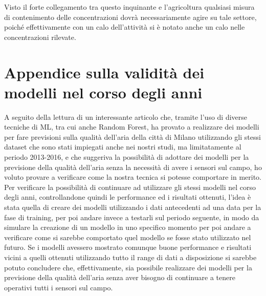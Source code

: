Visto il forte collegamento tra questo inquinante e l'agricoltura qualsiasi misura di contenimento delle concentrazioni dovrà necessariamente agire su tale settore, poiché effettivamente con un calo dell'attività si è notato anche un calo nelle concentrazioni rilevate.

\chapter{Appendice sulla validità dei modelli nel corso degli anni}
A seguito della lettura di un interessante articolo \cite{app10134587} che, tramite l'uso di diverse tecniche di ML, tra cui anche Random Forest, ha provato a realizzare dei modelli per fare previsioni sulla qualità dell'aria della città di Milano utilizzando gli stessi dataset che sono stati impiegati anche nei nostri studi, ma limitatamente al periodo 2013-2016, e che suggeriva la possibilità di adottare dei modelli per la previsione della qualità dell'aria senza la necessità di avere i sensori sul campo, ho voluto provare a verificare come la nostra tecnica si potesse comportare in merito.
Per verificare la possibilità di continuare ad utilizzare gli stessi modelli nel corso degli anni, controllandone quindi le performance ed i risultati ottenuti, l'idea è stata quella di creare dei modelli utilizzando i dati antecedenti ad una data per la fase di training, per poi andare invece a testarli sul periodo seguente, in modo da simulare la creazione di un modello in uno specifico momento per poi andare a verificare come si sarebbe comportato quel modello se fosse stato utilizzato nel futuro. Se i modelli avessero mostrato comunque buone performance e risultati vicini a quelli ottenuti utilizzando tutto il range di dati a disposizione si sarebbe potuto concludere che, effettivamente, sia possibile realizzare dei modelli per la previsione della qualità dell'aria senza aver bisogno di continuare a tenere operativi tutti i sensori sul campo.  

